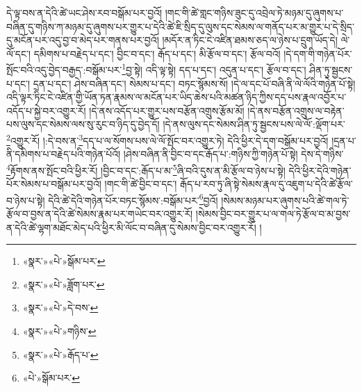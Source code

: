 དེ་ལྟ་བས་ན་དེའི་ཚེ་ཡང་ཤེས་རབ་བསྒོམ་པར་བྱའོ། །གང་གི་ཚེ་གླང་གཉིས་ཟུང་དུ་འབྲེལ་ཏེ་མཉམ་དུ་ཞུགས་པ་བཞིན་དུ་གཉིས་ཀ་མཉམ་དུ་ཞུགས་པར་གྱུར་པ་དེའི་ཚེ་ཇི་སྲིད་དུ་ལུས་དང་སེམས་ལ་གནོད་པར་མ་གྱུར་པ་དེ་སྲིད་དུ་མངོན་པར་འདུ་བྱ་བ་མེད་པར་གནས་པར་བྱའོ། །མདོར་ན་ཏིང་ངེ་འཛིན་ཐམས་ཅད་ལ་ཉེས་པ་དྲུག་ཡོད་དེ། ལེ་ལོ་དང་། དམིགས་པ་བརྗེད་པ་དང་། བྱིང་བ་དང་། རྒོད་པ་དང་། མི་རྩོལ་བ་དང་། རྩོལ་བའོ། །དེ་དག་གི་གཉེན་པོར་སྤོང་བའི་འདུ་བྱེད་བརྒྱད་:བསྒོམ་པར་\footnote{«སྣར་»«པེ་»སྒོམ་པར་}བྱ་སྟེ། འདི་ལྟ་སྟེ། དད་པ་དང་། འདུན་པ་དང་། རྩོལ་བ་དང་། ཤིན་ཏུ་སྦྱངས་པ་དང་། དྲན་པ་དང་། ཤེས་བཞིན་དང་། སེམས་པ་དང་། བཏང་སྙོམས་སོ། །དེ་ལ་དང་པོ་བཞི་ནི་ལེ་ལོའི་གཉེན་པོ་སྟེ། འདི་ལྟར་ཏིང་ངེ་འཛིན་གྱི་ཡོན་ཏན་རྣམས་ལ་མངོན་པར་ཡིད་ཆེས་པའི་མཚན་ཉིད་ཀྱིས་དད་པས་རྣལ་འབྱོར་པ་འདོད་པ་སྐྱེ་བར་འགྱུར་རོ། །དེ་ནས་འདོད་པར་གྱུར་པས་བརྩོན་འགྲུས་རྩོམ་མོ། །དེ་ནས་བརྩོན་འགྲུས་ལ་བརྟེན་པས་ལུས་དང་སེམས་ལས་སུ་རུང་བ་ཉིད་དུ་བྱེད་དོ། །དེ་ནས་ལུས་དང་སེམས་ཤིན་ཏུ་སྦྱངས་པས་ལེ་ལོ་:ལྡོག་པར་\footnote{«སྣར་»«པེ་»ཟློག་པར་}འགྱུར་རོ། །:དེ་བས་ན་\footnote{«སྣར་»«པེ་»དེ་བས་}དད་པ་ལ་སོགས་པས་ལེ་ལོ་སྤོང་བར་འགྱུར་ཏེ། དེའི་ཕྱིར་དེ་དག་བསྒོམ་པར་བྱའོ། །དྲན་པ་ནི་དམིགས་པ་བརྗེད་པའི་གཉེན་པོའོ། །ཤེས་བཞིན་ནི་བྱིང་བ་དང་རྒོད་པ་:གཉིས་ཀྱི་གཉེན་པོ་སྟེ། དེས་དེ་གཉིས་\footnote{«སྣར་»«པེ་»གཉིས་}རྟོགས་ནས་སྤོང་བའི་ཕྱིར་རོ། །བྱིང་བ་དང་:རྒོད་པ་མ་\footnote{«སྣར་»«པེ་»རྒོད་པ་}ཞི་བའི་དུས་ན་མི་རྩོལ་བ་ཉེས་པ་སྟེ། དེའི་ཕྱིར་དེའི་གཉེན་པོར་སེམས་པ་བསྒོམ་པར་བྱའོ། །གང་གི་ཚེ་བྱིང་བ་དང་། རྒོད་པ་རབ་ཏུ་ཞི་སྟེ་སེམས་རྣལ་དུ་འཇུག་པ་དེའི་ཚེ་རྩོལ་བ་ཉེས་པ་སྟེ། དེའི་ཚེ་དེའི་གཉེན་པོར་བཏང་སྙོམས་:བསྒོམ་པར་\footnote{«པེ་»སྒོམ་པར་}བྱའོ། །སེམས་མཉམ་པར་ཞུགས་པའི་ཚེ་གལ་ཏེ་རྩོལ་བ་བྱས་ན་དེའི་ཚེ་སེམས་རྣམ་པར་གཡེང་བར་འགྱུར་རོ། །སེམས་བྱིང་བར་གྱུར་པ་ལ་གལ་ཏེ་རྩོལ་བ་མ་བྱས་ན་དེའི་ཚེ་ལྷག་མཐོང་མེད་པའི་ཕྱིར་མི་ལོང་བ་བཞིན་དུ་སེམས་བྱིང་བར་འགྱུར་རོ། །
